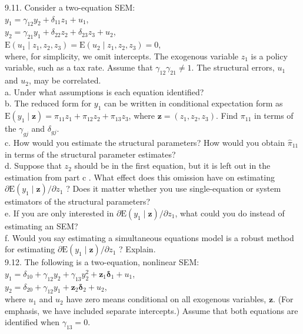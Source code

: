 \documentclass[10pt]{article}
\begin{document}
9.11. Consider a two-equation SEM:\\
$y_{1}=\gamma_{12} y_{2}+\delta_{11} z_{1}+u_{1}$,\\
$y_{2}=\gamma_{21} y_{1}+\delta_{22} z_{2}+\delta_{23} z_{3}+u_{2}$,\\
$\mathrm{E}\left(u_{1} \mid z_{1}, z_{2}, z_{3}\right)=\mathrm{E}\left(u_{2} \mid z_{1}, z_{2}, z_{3}\right)=0$,\\
where, for simplicity, we omit intercepts. The exogenous variable $z_{1}$ is a policy variable, such as a tax rate. Assume that $\gamma_{12} \gamma_{21} \neq 1$. The structural errors, $u_{1}$ and $u_{2}$, may be correlated.\\
a. Under what assumptions is each equation identified?\\
b. The reduced form for $y_{1}$ can be written in conditional expectation form as $\mathrm{E}\left(y_{1} \mid \mathbf{z}\right)= \pi_{11} z_{1}+\pi_{12} z_{2}+\pi_{13} z_{3}$, where $\mathbf{z}=\left(z_{1}, z_{2}, z_{3}\right)$. Find $\pi_{11}$ in terms of the $\gamma_{g j}$ and $\delta_{g j}$.\\
c. How would you estimate the structural parameters? How would you obtain $\hat{\pi}_{11}$ in terms of the structural parameter estimates?\\
d. Suppose that $z_{2}$ should be in the first equation, but it is left out in the estimation from part c . What effect does this omission have on estimating $\partial \mathrm{E}\left(y_{1} \mid \mathbf{z}\right) / \partial z_{1}$ ? Does it matter whether you use single-equation or system estimators of the structural parameters?\\
e. If you are only interested in $\partial \mathrm{E}\left(y_{1} \mid \mathbf{z}\right) / \partial z_{1}$, what could you do instead of estimating an SEM?\\
f. Would you say estimating a simultaneous equations model is a robust method for estimating $\partial \mathrm{E}\left(y_{1} \mid \mathbf{z}\right) / \partial z_{1}$ ? Explain.\\
9.12. The following is a two-equation, nonlinear SEM:\\
$y_{1}=\delta_{10}+\gamma_{12} y_{2}+\gamma_{13} y_{2}^{2}+\mathbf{z}_{1} \boldsymbol{\delta}_{1}+u_{1}$,\\
$y_{2}=\delta_{20}+\gamma_{12} y_{1}+\mathbf{z}_{2} \boldsymbol{\delta}_{2}+u_{2}$,\\
where $u_{1}$ and $u_{2}$ have zero means conditional on all exogenous variables, $\mathbf{z}$. (For emphasis, we have included separate intercepts.) Assume that both equations are identified when $\gamma_{13}=0$.\\
\end{document}

